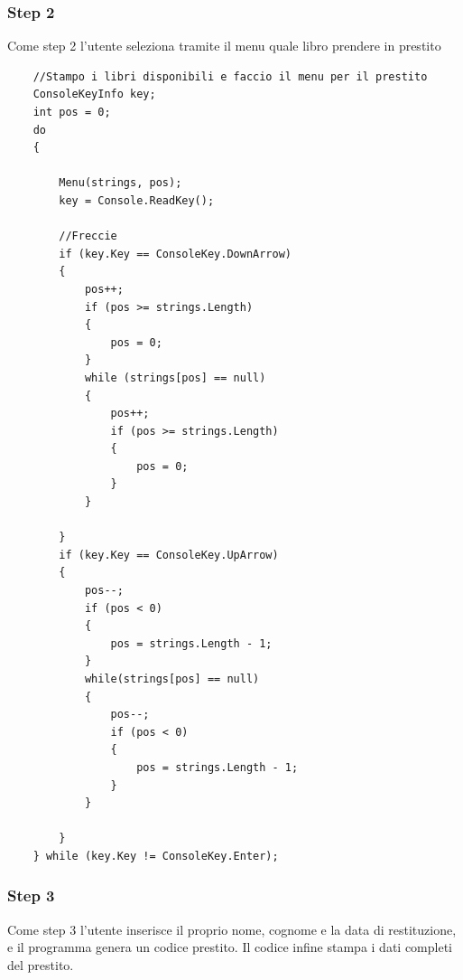 \documentclass[a4paper,12pt]{article}
\begin{document}
\newpage

\subsubsection{Step 2}
Come step 2 l'utente seleziona tramite il menu quale libro prendere in prestito

\begin{lstlisting}
    //Stampo i libri disponibili e faccio il menu per il prestito
    ConsoleKeyInfo key;
    int pos = 0;
    do
    {
                
        Menu(strings, pos);
        key = Console.ReadKey();

        //Freccie
        if (key.Key == ConsoleKey.DownArrow)
        {
            pos++;
            if (pos >= strings.Length)
            {
                pos = 0;
            }
            while (strings[pos] == null)
            {
                pos++;
                if (pos >= strings.Length)
                {
                    pos = 0;
                }
            }
                    
        }
        if (key.Key == ConsoleKey.UpArrow)
        {
            pos--;
            if (pos < 0)
            {
                pos = strings.Length - 1;
            }
            while(strings[pos] == null)
            {
                pos--;
                if (pos < 0)
                {
                    pos = strings.Length - 1;
                }
            }

        }
    } while (key.Key != ConsoleKey.Enter);
\end{lstlisting}

\newpage

\subsubsection{Step 3}
Come step 3 l'utente inserisce il proprio nome, cognome e la data di restituzione, e il programma genera un codice prestito.
Il codice infine stampa i dati completi del prestito.
\end{document}
